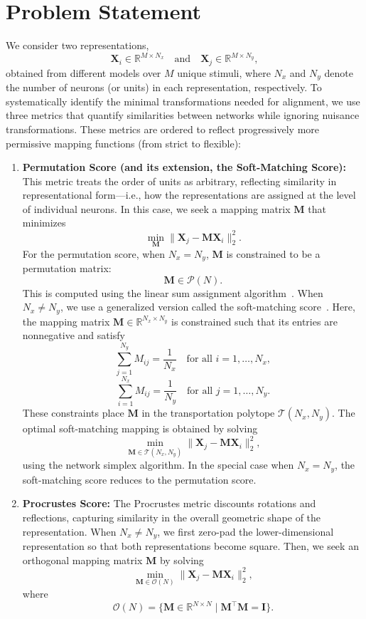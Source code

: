 \documentclass[10pt,letterpaper]{article}
\begin{document}
\section{Problem Statement}
We consider two representations, 
\[
\bm{X}_i\in \mathbb{R}^{M\times N_x} \quad \text{and} \quad \bm{X}_j\in \mathbb{R}^{M\times N_y},
\]
obtained from different models over \(M\) unique stimuli, where \(N_x\) and \(N_y\) denote the number of neurons (or units) in each representation, respectively. To systematically identify the minimal transformations needed for alignment, we use three metrics that quantify similarities between networks while ignoring nuisance transformations. These metrics are ordered to reflect progressively more permissive mapping functions (from strict to flexible):

\begin{enumerate}
    \item \textbf{Permutation Score (and its extension, the Soft-Matching Score):}  
    This metric treats the order of units as arbitrary, reflecting similarity in representational form---i.e., how the representations are assigned at the level of individual neurons. In this case, we seek a mapping matrix \(\bm{M}\) that minimizes
    \[
    \min_{\bm{M}} \|\bm{X}_j - \bm{M}\bm{X}_i\|_2^2.
    \]
    For the permutation score, when \(N_x = N_y\), \(\bm{M}\) is constrained to be a permutation matrix:
    \[
    \bm{M} \in \mathcal{P}(N).
    \]
    This is computed using the linear sum assignment algorithm~\citep{burkard2012assignment}. When \(N_x \neq N_y\), we use a generalized version called the soft-matching score~\citep{khosla2024soft}. Here, the mapping matrix \(\bm{M} \in \mathbb{R}^{N_x \times N_y}\) is constrained such that its entries are nonnegative and satisfy
    \[
    \sum_{j=1}^{N_y} M_{ij} = \frac{1}{N_x} \quad \text{for all } i = 1, \dots, N_x,
    \]
    \[
    \sum_{i=1}^{N_x} M_{ij} = \frac{1}{N_y} \quad \text{for all } j = 1, \dots, N_y.
    \]
    These constraints place \(\bm{M}\) in the transportation polytope \(\mathcal{T}(N_x, N_y)\). The optimal soft-matching mapping is obtained by solving
    \[
    \min_{\bm{M} \in \mathcal{T}(N_x, N_y)} \|\bm{X}_j - \bm{M}\bm{X}_i\|_2^2,
    \]
    using the network simplex algorithm. In the special case when \(N_x = N_y\), the soft-matching score reduces to the permutation score.

    \item \textbf{Procrustes Score:}  
    The Procrustes metric discounts rotations and reflections, capturing similarity in the overall geometric shape of the representation. When \(N_x \neq N_y\), we first zero-pad the lower-dimensional representation so that both representations become square. Then, we seek an orthogonal mapping matrix \(\bm{M}\) by solving
    \[
    \min_{\bm{M} \in \mathcal{O}(N)} \|\bm{X}_j - \bm{M}\bm{X}_i\|_2^2,
    \]
    where
    \[
    \mathcal{O}(N) = \{\bm{M} \in \mathbb{R}^{N \times N} \mid \bm{M}^\top \bm{M} = \bm{I}\}.
    \]


\end{enumerate}
\end{document}
